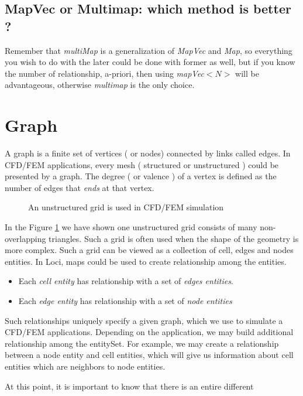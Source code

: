 \subsection{ MapVec or Multimap: which method is better ? }
\par Remember that {\em multiMap} is a generalization of {\em MapVec } and {\em Map}, 
so everything you wish to do with the later could be done with former as well, but
if you know the number of relationship, a-priori, then using {\em mapVec$<N>$} 
will be advantageous, otherwise {\em multimap} is the only choice. 

\section { Graph }
A graph is a finite set of vertices ( or nodes) connected by links called edges. 
In CFD/FEM applications, every mesh ( structured or unstructured ) could be 
presented by a graph. The degree ( or valence ) of a vertex is defined as the
number of edges that {\em ends} at that vertex.  
%
\begin{figure}[h]
\vspace{2.0in}\caption { An unstructured grid is used in CFD/FEM simulation }
\label{FigGraph}
\end{figure}
%
\par In the Figure \ref{FigGraph} we have shown one unstructured grid consists of
many non-overlapping triangles. Such a grid is often used when the shape of the geometry 
is more complex. Such a grid can be viewed as a collection of cell, edges
and nodes entities. In Loci, maps could be used to create relationship among the
entities.  
\begin{itemize}
\item Each {\em cell entity} has relationship with a set of {\em edges entities}.
\item Each {\em edge entity} has relationship with a set of {\em node entities}
\end{itemize}
Such relationships uniquely specify a given graph,
which we use to simulate a CFD/FEM applications. Depending on the application, 
we may build additional relationship among the entitySet. For example, we may 
create a relationship between a node entity and cell entities, which will give 
us information about cell entities which are neighbors to node entities.
%
\par At this point, it is important to know that there is an entire different
